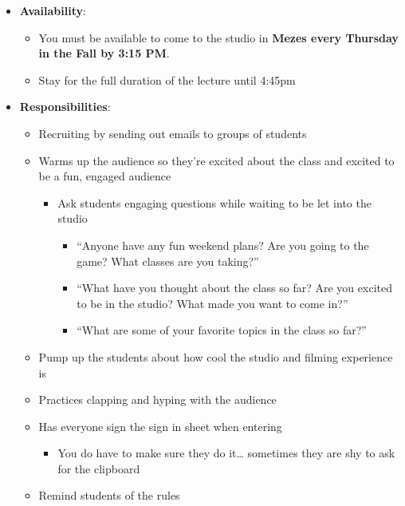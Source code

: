 \documentclass[
]{article}
\providecommand{\tightlist}{%
  \setlength{\itemsep}{0pt}\setlength{\parskip}{0pt}}
\begin{document}
\begin{itemize}
\tightlist
\item
  \textbf{Availability}:

  \begin{itemize}
  \tightlist
  \item
    You must be available to come to the studio in \textbf{Mezes every Thursday in the Fall by 3:15 PM}.
  \item
    Stay for the full duration of the lecture until 4:45pm
  \end{itemize}
\item
  \textbf{Responsibilities}:

  \begin{itemize}
  \tightlist
  \item
    Recruiting by sending out emails to groups of students
  \item
    Warms up the audience so they're excited about the class and excited to be a fun, engaged audience

    \begin{itemize}
    \tightlist
    \item
      Ask students engaging questions while waiting to be let into the studio

      \begin{itemize}
      \tightlist
      \item
        ``Anyone have any fun weekend plans? Are you going to the game? What classes are you taking?''
      \item
        ``What have you thought about the class so far? Are you excited to be in the studio? What made you want to come in?''
      \item
        ``What are some of your favorite topics in the class so far?''
      \end{itemize}
    \end{itemize}
  \item
    Pump up the students about how cool the studio and filming experience is
  \item
    Practices clapping and hyping with the audience
  \item
    Has everyone sign the sign in sheet when entering

    \begin{itemize}
    \tightlist
    \item
      You do have to make sure they do it\ldots{} sometimes they are shy to ask for the clipboard
    \end{itemize}
  \item
    Remind students of the rules


\end{itemize}
\end{itemize}
\end{document}
